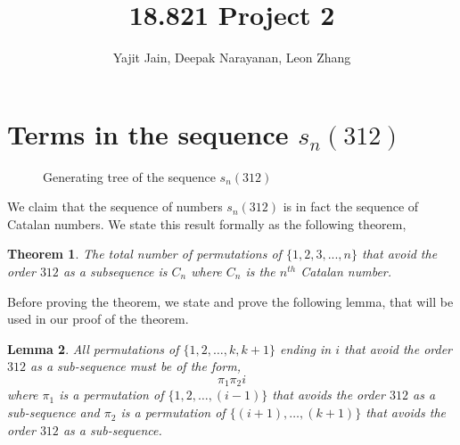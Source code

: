 \documentclass[11pt,letterpaper,twoside,english]{article}
\title{18.821 Project 2}
\author{Yajit Jain, Deepak Narayanan, Leon Zhang}
\theoremstyle{theorem}
\newtheorem{theorem}{Theorem}
\newtheorem{lemma}[theorem]{Lemma}
\theoremstyle{remark}
\begin{document}
\maketitle

\section{Terms in the sequence $s_n(312)$}

\begin{figure}
\caption{Generating tree of the sequence $s_n(312)$} \label{fig:M1}
\end{figure}

We claim that the sequence of numbers $s_n(312)$ is in fact the sequence of Catalan numbers. We state this result formally as the following theorem,

\begin{theorem}
The total number of permutations of $\{1,2,3,...,n\}$ that avoid the order $312$ as a subsequence is $C_n$ where $C_n$ is the $n^{th}$ Catalan number.
\end{theorem}

Before proving the theorem, we state and prove the following lemma, that will be used in our proof of the theorem.
\begin{lemma}
All permutations of $\{1,2,\dots,k,k+1\}$ ending in $i$ that avoid the order $312$ as a sub-sequence must be of the form,
$$\pi_1 \pi_2 i$$
where $\pi_1$ is a permutation of $\{1,2,\ldots,(i-1)\}$ that avoids the order $312$ as a sub-sequence and $\pi_2$ is a permutation of $\{(i+1),\ldots,(k+1)\}$ that avoids the order $312$ as a sub-sequence.
\end{lemma}
\end{document}
